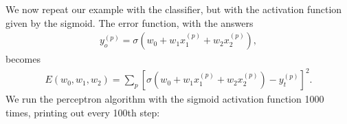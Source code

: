 \documentclass[a4paper,12pt,polish]{jupyterBook}
\begin{document}
\sphinxAtStartPar
We now repeat our example with the classifier, but with the activation function given by the sigmoid. The error function, with the answers
\begin{equation*}
\begin{split}y_o^{(p)}=\sigma(w_0+w_1 x_1^{(p)} +w_2 x_2^{(p)}), \end{split}
\end{equation*}
\sphinxAtStartPar
becomes
\begin{equation*}
\begin{split}E(w_0,w_1,w_2)=\sum_p \left [\sigma(w_0+w_1 x_1^{(p)} +w_2 x_2^{(p)})-y_t^{(p)} \right]^2.\end{split}
\end{equation*}
\sphinxAtStartPar
We run the perceptron algorithm with the sigmoid activation function 1000 times, printing out every 100th step:
\end{document}
